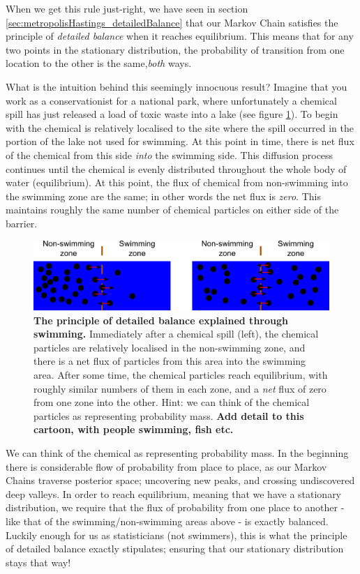 \documentclass[11pt,fullpage]{book}
\begin{document}
When we get this rule just-right, we have seen in section \ref{sec:metropolisHastings_detailedBalance} that our Markov Chain satisfies the principle of \textit{detailed balance} when it reaches equilibrium. This means that for any two points in the stationary distribution, the probability of transition from one location to the other is the same,\textit{both} ways. 

What is the intuition behind this seemingly innocuous result? Imagine that you work as a conservationist for a national park, where unfortunately a chemical spill has just released a load of toxic waste into a lake (see figure \ref{fig:metropolisHastings_swimmingDetailedBalance}). To begin with the chemical is relatively localised to the site where the spill occurred in the portion of the lake not used for swimming. At this point in time, there is net flux of the chemical from this side \textit{into} the swimming side. This diffusion process continues until the chemical is evenly distributed throughout the whole body of water (equilibrium). At this point, the flux of chemical from non-swimming into the swimming zone are the same; in other words the net flux is \textit{zero}. This maintains roughly the same number of chemical particles on either side of the barrier.

\begin{figure}
\centerline{\includegraphics[width=1.0\textwidth]{metropolisHastings_swimmingDetailedBalance.pdf}}
\caption{\textbf{The principle of detailed balance explained through swimming.} Immediately after a chemical spill (left), the chemical particles are relatively localised in the non-swimming zone, and there is a net flux of particles from this area into the swimming area. After some time, the chemical particles reach equilibrium, with roughly similar numbers of them in each zone, and a \textit{net} flux of zero from one zone into the other. Hint: we can think of the chemical particles as representing probability mass. \textbf{Add detail to this cartoon, with people swimming, fish etc.}}\label{fig:metropolisHastings_swimmingDetailedBalance}
\end{figure}

We can think of the chemical as representing probability mass. In the beginning there is considerable flow of probability from place to place, as our Markov Chains traverse posterior space; uncovering new peaks, and crossing undiscovered deep valleys. In order to reach equilibrium, meaning that we have a stationary distribution, we require that the flux of probability from one place to another - like that of the swimming/non-swimming areas above - is exactly balanced. Luckily enough for us as statisticians (not swimmers), this is what the principle of detailed balance exactly stipulates; ensuring that our stationary distribution stays that way!
\end{document}
